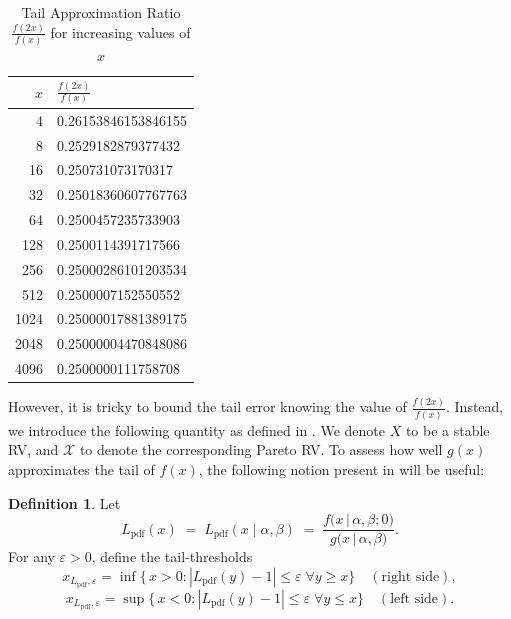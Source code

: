 \documentclass{article}
\theoremstyle{definition}
\newtheorem{definition}{Definition}[section]
\begin{document}
\begin{table}[h!]
\centering
\caption{Tail Approximation Ratio $\frac{f(2x)}{f(x)}$ for increasing values of $x$}
\begin{tabular}{r|l}
\toprule
$x$    & $\displaystyle \frac{f(2x)}{f(x)}$ \\ 
\midrule
4      & 0.26153846153846155 \\
8      & 0.2529182879377432  \\
16     & 0.250731073170317   \\
32     & 0.25018360607767763 \\
64     & 0.2500457235733903  \\
128    & 0.2500114391717566  \\
256    & 0.25000286101203534 \\
512    & 0.2500007152550552  \\
1024   & 0.25000017881389175 \\
2048   & 0.25000004470848086 \\
4096   & 0.2500000111758708  \\
\bottomrule
\end{tabular}
\end{table}
However, it is tricky to bound the tail error knowing the value of $\frac{f(2x)}{f(x)}$. Instead, we introduce the following quantity as defined in \cite{NolanJohnP2020USDM}.
\fi
We denote \(X\) to be a stable RV, and \(\mathcal{X}\) to denote the corresponding Pareto RV. To assess how well \(g(x)\) approximates the tail of \(f(x)\), the following notion present in \cite{NolanJohnP2020USDM} will be useful:
\begin{definition}
Let
\[
L_{\mathrm{pdf}}(x)
\;=\;
L_{\mathrm{pdf}}(x\mid \alpha,\beta)
\;=\;
\frac{f\bigl(x\,|\,\alpha,\beta;0\bigr)}{g\bigl(x\,|\,\alpha,\beta\bigr)}.
\]
For any \(\varepsilon>0\), define the tail‐thresholds
\[
x_{L_{\mathrm{pdf}},\varepsilon}
=\inf\bigl\{\,x>0:|L_{\mathrm{pdf}}(y)-1|\le\varepsilon\;\forall y\ge x\bigr\}
\quad(\text{right side}),
\]
\[
x_{L_{\mathrm{pdf}},\varepsilon}
=\sup\bigl\{\,x<0:|L_{\mathrm{pdf}}(y)-1|\le\varepsilon\;\forall y\le x\bigr\}
\quad(\text{left side}).
\]
\end{definition}
\end{document}
